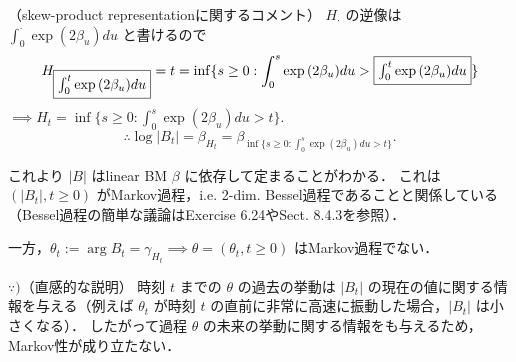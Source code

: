 \documentclass{jsarticle}
\begin{document}
（skew-product representationに関するコメント）
$H_{\cdot}$ の逆像は $\int_0^{\cdot}\exp{(2\beta_u)}du$ と書けるので
\begin{align}
    H_{\fbox{$\int_0^t\exp{(2\beta_u)}du$}}
    = t
    = \inf\{s\ge0:\int_0^s\exp{(2\beta_u)}du>\fbox{$\int_0^t\exp{(2\beta_u)}du$}\}
\end{align}
$\implies H_t = \inf\{s\ge0:\int_0^s\exp{(2\beta_u)}du>t\}.$
$$
\therefore 
\log{\lvert B_t\rvert}
= \beta_{H_t}
= \beta_{\inf\{s\ge0:\int_0^s\exp{(2\beta_u)}du>t\}}.
$$

これより $\lvert B\rvert$ はlinear BM $\beta$ に依存して定まることがわかる．
これは $(\lvert B_t\rvert, t\ge0)$ がMarkov過程，i.e. 2-dim. Bessel過程であることと関係している（Bessel過程の簡単な議論はExercise 6.24やSect. 8.4.3を参照）．

一方，$\theta_t:=\arg B_t=\gamma_{H_t}\implies \theta=(\theta_t, t\ge0)$ はMarkov過程でない．

\begin{screen}
    $\because)$（直感的な説明）
    時刻 $t$ までの $\theta$ の過去の挙動は $\lvert B_t\rvert$ の現在の値に関する情報を与える（例えば $\theta_t$ が時刻 $t$ の直前に非常に高速に振動した場合，$\lvert B_t\rvert$ は小さくなる）\nazo．
    したがって過程 $\theta$ の未来の挙動に関する情報をも与えるため，Markov性が成り立たない．
\end{screen}
\end{document}
